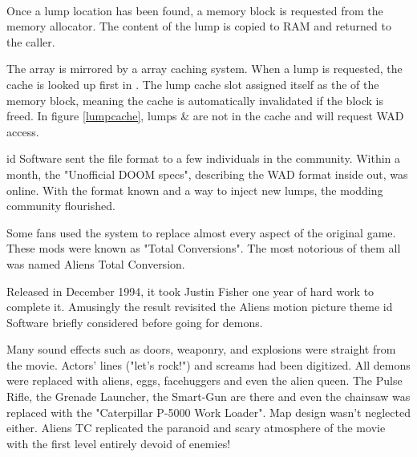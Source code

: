 \par
{}\\
\par
Once a lump location has been found, a memory block is requested from the memory allocator. The content of the lump is copied to RAM and returned to the caller. \\
\par
The  array is mirrored by a  array caching system. When a lump is requested, the cache is looked up first in . The lump cache slot assigned itself as the  of the memory block, meaning the cache is automatically invalidated if the block is freed. In figure \ref{lumpcache}, lumps  \&  are not in the cache and will request WAD access.\\
\par
{}
\par
{}
\pagebreak

id Software sent the file format to a few individuals in the community. Within a month, the "Unofficial DOOM specs", describing the WAD format inside out, was online. With the format known and a way to inject new lumps, the modding community flourished.\\
\par

Some fans used the system to replace almost every aspect of the original game. These mods were known as "Total Conversions". The most notorious of them all was named Aliens Total Conversion.\\
\par
Released in December 1994, it took Justin Fisher one year of hard work to complete it. Amusingly the result revisited the Aliens motion picture theme id Software briefly considered before going for demons.\\
\par
 \par
 Many sound effects such as doors, weaponry, and explosions were straight from the movie. Actors' lines ("let's rock!") and screams had been digitized. All demons were replaced with aliens, eggs, facehuggers and even the alien queen. The Pulse Rifle, the Grenade Launcher, the Smart-Gun are there and even the chainsaw was replaced with the "Caterpillar P-5000 Work Loader". Map design wasn't neglected either. Aliens TC replicated the paranoid and scary atmosphere of the movie with the first level entirely devoid of enemies!

